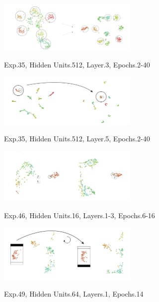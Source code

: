 \documentclass[a4paper,11pt,titlepage]{article}
\begin{document}
	\begin{figure}[H]
    			\centering	
			{{\includegraphics[width=0.6\textwidth]
    				{img/conc_X35_H512_L3_E2-40.png} 
    			}}%
    			\caption{Exp.35, Hidden Units.512, Layer.3, Epochs.2-40}%
    		\label{fig:mnistHinton}
	\end{figure}

	\begin{figure}[H]
    			\centering	
			{{\includegraphics[width=0.6\textwidth]
    				{img/conc_X35_H512_L5_E2-40.png} 
    			}}%
    			\caption{Exp.35, Hidden Units.512, Layer.5, Epochs.2-40}%
    		\label{fig:mnistHinton}
	\end{figure}
	
	\begin{figure}[H]
    			\centering	
			{{\includegraphics[width=0.6\textwidth]
    				{img/conc_X46_H16_L1-3_E6-16.png} 
    			}}%
    			\caption{Exp.46, Hidden Units.16, Layers.1-3, Epochs.6-16}%
    		\label{fig:mnistHinton}
	\end{figure}

	\begin{figure}[H]
    			\centering	
			{{\includegraphics[width=0.6\textwidth]
    				{img/conc_X49_H64_L1_E14-26.png} 
    			}}%
    			\caption{Exp.49, Hidden Units.64, Layers.1, Epochs.14}%
    		\label{fig:mnistHinton}
	\end{figure}
\end{document}
